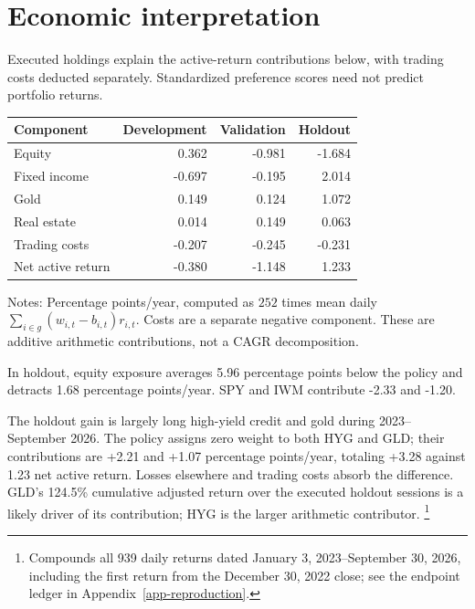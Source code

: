 \documentclass[11pt,a4paper]{article}
\begin{document}
\section{Economic interpretation}
Executed holdings explain the active-return contributions below, with trading
costs deducted separately. Standardized preference scores need not predict
portfolio returns.
\begin{center}\begin{minipage}{\textwidth}\small
{}\label{tab-attribution}
\begin{tabular*}{\textwidth}{@{\extracolsep{\fill}}lrrr@{}}\toprule
Component & Development & Validation & Holdout\\\midrule
Equity & 0.362 & -0.981 & -1.684\\
Fixed income & -0.697 & -0.195 & 2.014\\
Gold & 0.149 & 0.124 & 1.072\\
Real estate & 0.014 & 0.149 & 0.063\\
Trading costs & -0.207 & -0.245 & -0.231\\
Net active return & -0.380 & -1.148 & 1.233\\
\bottomrule\end{tabular*}\par\vspace{4pt}\footnotesize
Notes: Percentage points/year, computed as $252$ times mean daily $\sum_{i\in g}(w_{i,t}-b_{i,t})r_{i,t}$. Costs are a separate negative component. These are additive arithmetic contributions, not a CAGR decomposition.
\end{minipage}\end{center}
In holdout, equity exposure averages 5.96 percentage points below the policy and detracts 1.68 percentage points/year. SPY and IWM contribute -2.33 and -1.20.

The holdout gain is largely long high-yield credit and gold during 2023--September 2026. The policy assigns zero weight to both HYG and GLD; their contributions are +2.21 and +1.07 percentage points/year, totaling +3.28 against 1.23 net active return. Losses elsewhere and trading costs absorb the difference. GLD's 124.5\% cumulative adjusted return over the executed holdout sessions is a likely driver of its contribution; HYG is the larger arithmetic contributor.
\footnote{Compounds all 939 daily returns dated January 3, 2023--September 30, 2026, including the first return from the December 30, 2022 close; see the endpoint ledger in Appendix~\ref{app-reproduction}.}
\end{document}
